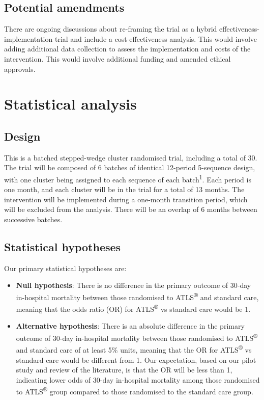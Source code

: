 \documentclass[
]{scrartcl}
\providecommand{\tightlist}{%
  \setlength{\itemsep}{0pt}\setlength{\parskip}{0pt}}\usepackage{longtable,booktabs,array}
\begin{document}
\hypertarget{potential-amendments}{%
\subsection{Potential amendments}\label{potential-amendments}}

There are ongoing discussions about re-framing the trial as a hybrid
effectiveness-implementation trial and include a cost-effectiveness
analysis. This would involve adding additional data collection to assess
the implementation and costs of the intervention. This would involve
additional funding and amended ethical approvals.

\newpage{}

\hypertarget{statistical-analysis}{%
\section{Statistical analysis}\label{statistical-analysis}}

\hypertarget{design}{%
\subsection{Design}\label{design}}

This is a batched stepped-wedge cluster randomised trial, including a
total of 30. The trial will be composed of 6 batches of identical
12-period 5-sequence design, with one cluster being assigned to each
sequence of each batch\textsuperscript{1}. Each period is one month, and
each cluster will be in the trial for a total of 13 months. The
intervention will be implemented during a one-month transition period,
which will be excluded from the analysis. There will be an overlap of 6
months between successive batches.

\hypertarget{statistical-hypotheses}{%
\subsection{Statistical hypotheses}\label{statistical-hypotheses}}

Our primary statistical hypotheses are:

\begin{itemize}
\tightlist
\item
  \textbf{Null hypothesis}: There is no difference in the primary
  outcome of 30-day in-hospital mortality between those randomised to
  ATLS\textsuperscript{®} and standard care, meaning that the odds ratio
  (OR) for ATLS\textsuperscript{®} vs standard care would be 1.
\item
  \textbf{Alternative hypothesis}: There is an absolute difference in
  the primary outcome of 30-day in-hospital mortality between those
  randomised to ATLS\textsuperscript{®} and standard care of at least
  5\% units, meaning that the OR for ATLS\textsuperscript{®} vs standard
  care would be different from 1. Our expectation, based on our pilot
  study and review of the literature, is that the OR will be less than
  1, indicating lower odds of 30-day in-hospital mortality among those
  randomised to ATLS\textsuperscript{®} group compared to those
  randomised to the standard care group.
\end{itemize}
\end{document}
